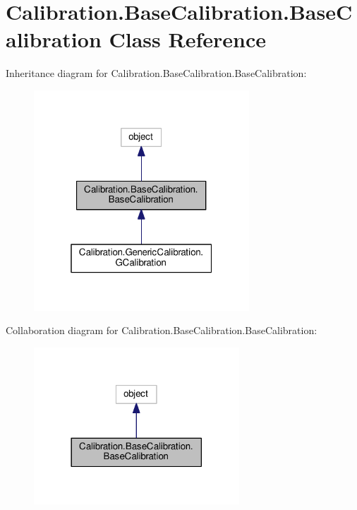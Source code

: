 \hypertarget{class_calibration_1_1_base_calibration_1_1_base_calibration}{}\section{Calibration.\+Base\+Calibration.\+Base\+Calibration Class Reference}
\label{class_calibration_1_1_base_calibration_1_1_base_calibration}


Inheritance diagram for Calibration.\+Base\+Calibration.\+Base\+Calibration\+:\nopagebreak
\begin{figure}[H]
\begin{center}
\leavevmode
\includegraphics[width=229pt]{class_calibration_1_1_base_calibration_1_1_base_calibration__inherit__graph}
\end{center}
\end{figure}


Collaboration diagram for Calibration.\+Base\+Calibration.\+Base\+Calibration\+:\nopagebreak
\begin{figure}[H]
\begin{center}
\leavevmode
\includegraphics[width=218pt]{class_calibration_1_1_base_calibration_1_1_base_calibration__coll__graph}
\end{center}
\end{figure}


